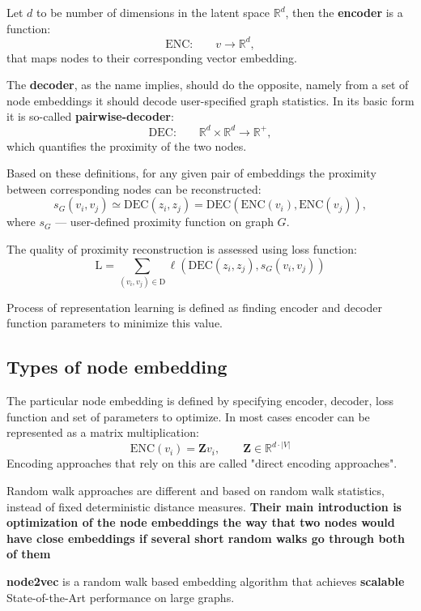 Let $d$ to be number of dimensions in the latent space $\mathbb{R}^d$, then the \textbf{encoder} is a function:
$$
\text{ENC:}\qquad v \to \mathbb{R}^d,
$$
that maps nodes to their corresponding vector embedding. 

The \textbf{decoder}, as the name implies, should do the opposite, namely from a set of node embeddings it should decode user-specified graph statistics. In its basic form it is so-called \textbf{pairwise-decoder}:
$$
	\text{DEC:}\qquad \mathbb{R}^d \times \mathbb{R}^d \to \mathbb{R}^{+},
$$
which quantifies the proximity of the two nodes.

Based on these definitions, for any given pair of embeddings the proximity between corresponding nodes can be reconstructed: 
$$
   s_G(v_i, v_j) \simeq \mathrm{DEC}(z_i, z_j) 
     = \mathrm{DEC}(\mathrm{ENC}(v_i), \mathrm{ENC}(v_j)),
$$
where $s_G$ --- user-defined proximity function on graph $G$.

The quality of proximity reconstruction is assessed using loss function: 
$$
   \mathrm{L} = \sum_{(v_i, v_j) \in \mathrm{D}} \ell\left(
     \mathrm{DEC}(z_i, z_j), s_G(v_i, v_j)
   \right)
$$

Process of representation learning is defined as finding encoder and decoder function parameters to minimize this value.

\subsection{Types of node embedding}

The particular node embedding is defined by specifying encoder, decoder, loss function and set of parameters to optimize. In most cases encoder can be represented as a matrix multiplication: 
$$
  \mathrm{ENC}(v_i) = \mathbf{Z} v_i, \qquad \mathbf{Z} \in \mathbb{R}^{d \cdot |V|}
$$
Encoding approaches that rely on this are called "direct encoding approaches". \cite{DBLP:journals/corr/abs-1709-05584}

Random walk approaches are different and based on random walk statistics, instead of fixed deterministic distance measures. \textbf{Their main introduction is optimization of the node embeddings the way that two nodes would have close embeddings if several short random walks go through both of them}

\textbf{node2vec}\cite{DBLP:journals/corr/GroverL16} is a random walk based embedding algorithm that achieves \textbf{scalable} State-of-the-Art performance on large graphs.

